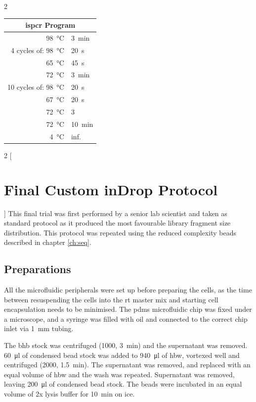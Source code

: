 \begin{appendix}
\begin{multicols}{2}
\begin{center}
\begin{tabular}{r|l}
	\multicolumn{2}{c}{\acrshort{ispcr} Program} \\
	\hline
	\SI{98}{\celsius} & \SI{3}{\minute} \\
	\hline
	4 cycles of: \SI{98}{\celsius} & \SI{20}{\second} \\
	\SI{65}{\celsius} & \SI{45}{\second} \\
	\SI{72}{\celsius} & \SI{3}{\minute} \\
	\hline
	10 cycles of: \SI{98}{\celsius} & \SI{20}{\second} \\
	\SI{67}{\celsius} & \SI{20}{\second} \\
	\SI{72}{\celsius} & \SI{3}{\min} \\
	\hline
	\SI{72}{\celsius} & \SI{10}{\minute} \\
	\SI{4}{\celsius} & inf. \\
\end{tabular}
\end{center}
\medskip

\end{multicols}

\newpage
\begin{multicols}{2}
[\section{Final Custom inDrop Protocol}\label{app:meth_indrop}]
This final trial was first performed by a senior lab scientist and taken as standard protocol as it produced the most favourable library fragment size distribution. This protocol was repeated using the reduced complexity beads described in chapter \ref{ch:seq}.\pms

\subsection{Preparations}
All the microfluidic peripherals were set up before preparing the cells, as the time between resuspending the cells into the \acrshort{rt} master mix and starting cell encapsulation needs to be minimised. The \acrshort{pdms} microfluidic chip was fixed under a microscope, and a syringe was filled with oil and connected to the correct chip inlet via \SI{1}{\mm} tubing.\pms

The \acrshort{bhb} stock was centrifuged (\SI{1000}{\rcf}, \SI{3}{\minute}) and the supernatant was removed. \SI{60}{\ul} of condensed bead stock was added to \SI{940}{\ul} of \acrshort{hbw}, vortexed well and centrifuged (\SI{2000}{\rcf}, \SI{1.5}{\minute}). The supernatant was removed, and replaced with an equal volume of \acrshort{hbw} and the wash was repeated. Supernatant was removed, leaving \SI{200}{\ul} of condensed bead stock. The beads were incubated in an equal volume of 2x lysis buffer for \SI{10}{\minute} on ice.\pms


\end{multicols}
\end{appendix}
